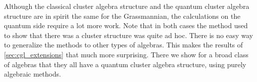 Although the classical cluster algebra structure and the quantum cluster algebra
structure are in spirit the same for the Grassmannian, the calculations on the quantum
side require a lot more work. Note that in both cases the method used to show that
there was a cluster structure was quite ad hoc. There is no easy way to generalize the
methods to other types of algebras. This makes the results of \cref{sec:cgl_extensions}
that much more surprising. There we show for a broad class of algebras that they all
have a quantum cluster algebra structure, using purely algebraic methods.
